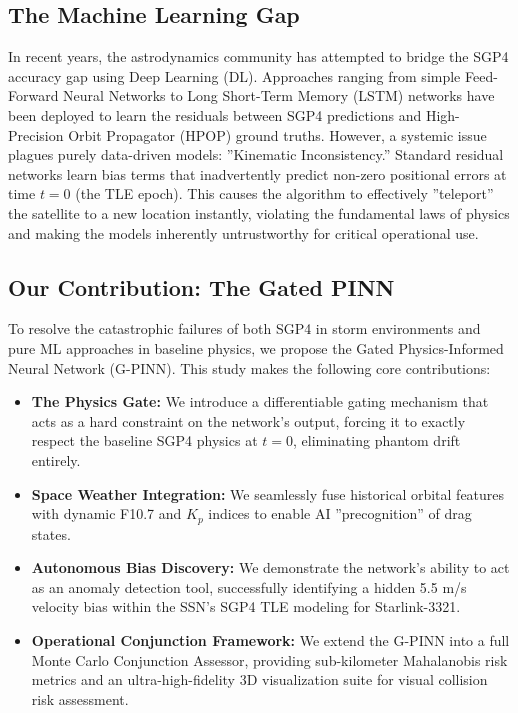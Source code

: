 \subsection{The Machine Learning Gap}
In recent years, the astrodynamics community has attempted to bridge the SGP4 accuracy gap using Deep Learning (DL). Approaches ranging from simple Feed-Forward Neural Networks to Long Short-Term Memory (LSTM) networks have been deployed to learn the residuals between SGP4 predictions and High-Precision Orbit Propagator (HPOP) ground truths. However, a systemic issue plagues purely data-driven models: ''Kinematic Inconsistency.'' Standard residual networks learn bias terms that inadvertently predict non-zero positional errors at time $t=0$ (the TLE epoch). This causes the algorithm to effectively ''teleport'' the satellite to a new location instantly, violating the fundamental laws of physics and making the models inherently untrustworthy for critical operational use.

\subsection{Our Contribution: The Gated PINN}
To resolve the catastrophic failures of both SGP4 in storm environments and pure ML approaches in baseline physics, we propose the Gated Physics-Informed Neural Network (G-PINN). This study makes the following core contributions:
\begin{itemize}
    \item \textbf{The Physics Gate:} We introduce a differentiable gating mechanism that acts as a hard constraint on the network's output, forcing it to exactly respect the baseline SGP4 physics at $t=0$, eliminating phantom drift entirely.
    \item \textbf{Space Weather Integration:} We seamlessly fuse historical orbital features with dynamic F10.7 and $K_p$ indices to enable AI ''precognition'' of drag states.
    \item \textbf{Autonomous Bias Discovery:} We demonstrate the network's ability to act as an anomaly detection tool, successfully identifying a hidden 5.5 m/s velocity bias within the SSN's SGP4 TLE modeling for Starlink-3321.
    \item \textbf{Operational Conjunction Framework:} We extend the G-PINN into a full Monte Carlo Conjunction Assessor, providing sub-kilometer Mahalanobis risk metrics and an ultra-high-fidelity 3D visualization suite for visual collision risk assessment.
\end{itemize}
